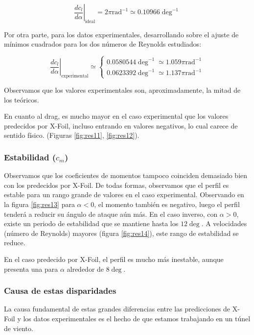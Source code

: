 \documentclass{article}
\begin{document}
$$\left. \frac{dc_l}{d\alpha} \right\rvert_{\text{ideal}} = 2\pi \text{rad}^{-1} \simeq 0.10966 \deg^{-1}$$

Por otra parte, para los datos experimentales, desarrollando sobre el ajuste de mínimos cuadrados para los dos números de Reynolds estudiados:

$$\left. \frac{dc_l}{d\alpha} \right\rvert_{\text{experimental}}  \simeq \begin{cases}
    0.0580544 \deg^{-1} \simeq 1.059\pi \text{rad}^{-1} \\
    0.0623392 \deg^{-1} \simeq 1.137\pi \text{rad}^{-1}
\end{cases}
$$

Observamos que los valores experimentales son, aproximadamente, la mitad de los teóricos.

En cuanto al drag, es mucho mayor en el caso experimental que los valores predecidos por X-Foil, incluso entrando
en valores negativos, lo cual carece de sentido físico. (Figuras \ref{fig:res11},  \ref{fig:res12}).

\subsubsection{Estabilidad (\texorpdfstring{$c_{m}$}{momentos})}

Observamos que los coeficientes de momentos tampoco coinciden demasiado bien con los predecidos por X-Foil. De todas formas, 
observamos que el perfil es estable para un rango grande de valores en el caso experimental. Observando en la figura \ref{fig:res13}
para $\alpha < 0$, el momento también es negativo, luego el perfil tenderá a reducir su ángulo de ataque aún más.
En el caso inverso, con $\alpha > 0$, existe un periodo de estabilidad que se mantiene hasta los $12\deg$. A velocidades 
(número de Reynolds) mayores (figura \ref{fig:res14}), este rango de estabilidad se reduce.

En el caso predecido por X-Foil, el perfil es mucho más inestable, aunque presenta una 
para $\alpha$ alrededor de $8\deg$.

\subsubsection{Causa de estas disparidades}

La causa fundamental de estas grandes diferencias entre las predicciones de X-Foil y los datos experimentales es el hecho de 
que estamos trabajando en un túnel de viento.
\end{document}

